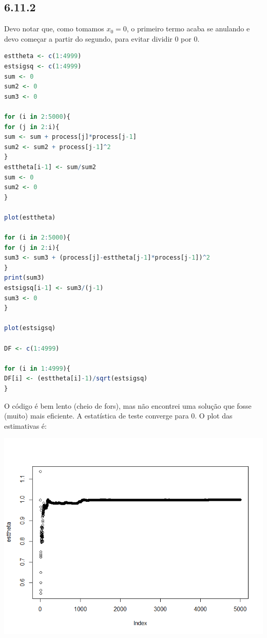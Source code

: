 \documentclass[12pt]{article}
\begin{document}
\subsection*{6.11.2}
Devo notar que, como tomamos $x_{0}=0$, o primeiro termo acaba se anulando e devo começar a partir do segundo, para evitar dividir 0 por 0.

\begin{lstlisting}[language=R]
esttheta <- c(1:4999)
estsigsq <- c(1:4999)
sum <- 0
sum2 <- 0
sum3 <- 0

for (i in 2:5000){
for (j in 2:i){
sum <- sum + process[j]*process[j-1]
sum2 <- sum2 + process[j-1]^2
}
esttheta[i-1] <- sum/sum2
sum <- 0
sum2 <- 0
}

plot(esttheta)

for (i in 2:5000){
for (j in 2:i){
sum3 <- sum3 + (process[j]-esttheta[j-1]*process[j-1])^2
}
print(sum3)
estsigsq[i-1] <- sum3/(j-1)
sum3 <- 0
}

plot(estsigsq)

DF <- c(1:4999)

for (i in 1:4999){
DF[i] <- (esttheta[i]-1)/sqrt(estsigsq)
}
\end{lstlisting}
O código é bem lento (cheio de fors), mas não encontrei uma solução que fosse (muito) mais eficiente. A estatística de teste converge para 0. O plot das estimativas é:

\begin{center}
\includegraphics*[scale=0.7]{1.png}
\end{center}
\end{document}
